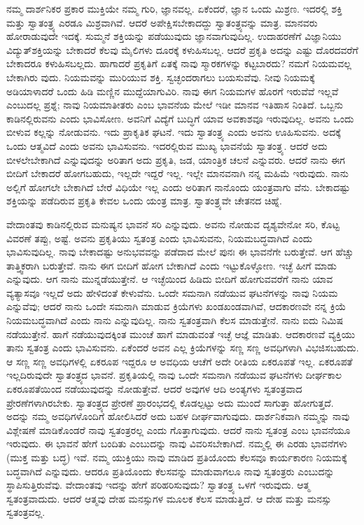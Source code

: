 ನಮ್ಮ ದಾರ್ಶನಿಕರ ಪ್ರಕಾರ ಮುಕ್ತಿಯೇ ನಮ್ಮ ಗುರಿ, ಜ್ಞಾನವಲ್ಲ. ಏಕೆಂದರೆ, ಜ್ಞಾನ ಒಂದು ಮಿಶ್ರಣ. ಇದರಲ್ಲಿ ಶಕ್ತಿ ಮತ್ತು ಸ್ವಾತಂತ್ರ್ಯ ಎರಡೂ ಮಿಶ್ರವಾಗಿವೆ. ಆದರೆ ಅಪೇಕ್ಷಿಸಬೇಕಾದದ್ದು ಸ್ವಾತಂತ್ರ್ಯವನ್ನು ಮಾತ್ರ. ಮಾನವರು ಹೋರಾಡುವುದೇ ಇದಕ್ಕೆ. ಸುಮ್ಮನೆ ಶಕ್ತಿಯನ್ನು ಪಡೆಯುವುದು ಜ್ಞಾನವಾಗುವುದಿಲ್ಲ. ಉದಾಹರಣೆಗೆ ವಿಜ್ಞಾನಿಯು ವಿದ್ಯುತ್​ಶಕ್ತಿಯನ್ನು ಬೇಕಾದರೆ ಕೆಲವು ಮೈಲಿಗಳು ದೂರಕ್ಕೆ ಕಳುಹಿಸಬಲ್ಲ. ಆದರೆ ಪ್ರಕೃತಿ ಅದನ್ನು ಎಷ್ಟು ದೊರದವರೆಗೆ ಬೇಕಾದರೂ ಕಳುಹಿಸಬಲ್ಲದು. ಹಾಗಾದರೆ ಪ್ರಕೃತಿಗೆ ಏತಕ್ಕೆ ನಾವು ಸ್ಮಾರಕಗಳನ್ನು ಕಟ್ಟಬಾರದು? ನಮಗೆ ನಿಯಮವಲ್ಲ ಬೇಕಾಗಿರು ವುದು. ನಿಯಮವನ್ನು ಮುರಿಯುವ ಶಕ್ತಿ. ಸ್ವಚ್ಛಂದರಾಗಲು ಬಯಸುವೆವು. ನೀವು ನಿಯಮಕ್ಕೆ ಅಡಿಯಾಳಾದರೆ ಒಂದು ಹಿಡಿ ಮಣ್ಣಿನ ಮುದ್ದೆಯಾಗುವಿರಿ. ನಾವು ಈಗ ನಿಯಮಗಳ ಹೊರಗೆ ಇರುವೆವೆ ಇಲ್ಲವೆ ಎಂಬುದಲ್ಲ ಪ್ರಶ್ನೆ; ನಾವು ನಿಯಮಾತೀತರು ಎಂಬ ಭಾವನೆಯ ಮೇಲೆ ಇಡೀ ಮಾನವ ಇತಿಹಾಸ ನಿಂತಿದೆ. ಒಬ್ಬನು ಕಾಡಿನಲ್ಲಿರುವನು ಎಂದು ಭಾವಿಸೋಣ. ಅವನಿಗೆ ವಿದ್ಯೆಗೆ ಬುದ್ಧಿಗೆ ಯಾವ ಅವಕಾಶವೂ ಇರುವುದಿಲ್ಲ. ಅವನು ಒಂದು ಬೀಳುವ ಕಲ್ಲನ್ನು ನೋಡುವನು. ಇದು ಪ್ರಾಕೃತಿಕ ಘಟನೆ. ಇದು ಸ್ವಾತಂತ್ರ್ಯ ಎಂದು ಅವನು ಊಹಿಸುವನು. ಅದಕ್ಕೆ ಒಂದು ಆತ್ಮವಿದೆ ಎಂದು ಅವನು ಭಾವಿಸುವನು. ಇದರಲ್ಲಿರುವ ಮುಖ್ಯ ಭಾವನೆಯೆ ಸ್ವಾತಂತ್ರ್ಯ. ಆದರೆ ಅದು ಬೀಳಲೇಬೇಕಾಗಿದೆ ಎನ್ನುವುದನ್ನು ಅರಿತಾಗ ಅದು ಪ್ರಕೃತಿ, ಜಡ, ಯಾಂತ್ರಿಕ ಚಲನೆ ಎನ್ನುವರು. ಆದರೆ ನಾನು ಈಗ ಬೀದಿಗೆ ಬೇಕಾದರೆ ಹೋಗಬಹುದು, ಇಲ್ಲದೇ ಇದ್ದರೆ ಇಲ್ಲ. ಇಲ್ಲೇ ಮಾನವನಾಗಿ ನನ್ನ ಮಹಿಮೆ ಇರುವುದು. ನಾನು ಅಲ್ಲಿಗೆ ಹೋಗಲೇ ಬೇಕಾಗಿದೆ ಬೇರೆ ವಿಧಿಯೇ ಇಲ್ಲ ಎಂದು ಅರಿತಾಗ ನಾನೊಂದು ಯಂತ್ರವಾಗು ವೆನು. ಬೇಕಾದಷ್ಟು ಶಕ್ತಿಯನ್ನು ಪಡೆದಿರುವ ಪ್ರಕೃತಿ ಕೇವಲ ಒಂದು ಯಂತ್ರ ಮಾತ್ರ. ಸ್ವಾತಂತ್ರ್ಯವೇ ಚೇತನದ ಚಿಹ್ನೆ.

ವೇದಾಂತವು ಕಾಡಿನಲ್ಲಿರುವ ಮನುಷ್ಯನ ಭಾವನೆ ಸರಿ ಎನ್ನುವುದು. ಅವನು ನೋಡುವ ದೃಶ್ಯವೇನೋ ಸರಿ, ಕೊಟ್ಟ ವಿವರಣೆ ತಪ್ಪು, ಅಷ್ಟೆ. ಅವನು ಪ್ರಕೃತಿಯು ಸ್ವತಂತ್ರ ಎಂದು ಭಾವಿಸುವನು, ನಿಯಮಬದ್ಧವಾಗಿದೆ ಎಂದು ಭಾವಿಸುವುದಿಲ್ಲ. ನಾವು ಬೇಕಾದಷ್ಟು ಅನುಭವವನ್ನು ಪಡೆದಾದ ಮೇಲೆ ಪುನಃ ಈ ಭಾವನೆಗೇ ಬರುತ್ತೇವೆ. ಆಗ ಹೆಚ್ಚು ತಾತ್ತ್ವಿಕರಾಗಿ ಬರುತ್ತೇವೆ. ನಾನು ಈಗ ಬೀದಿಗೆ ಹೋಗ ಬೇಕಾಗಿದೆ ಎಂದು ಇಟ್ಟುಕೊಳ್ಳೋಣ. ಇಚ್ಛೆ ಹೀಗೆ ಮಾಡು ಎನ್ನುವುದು. ಆಗ ನಾನು ಮುನ್ನಡೆಯುತ್ತೇನೆ. ಆ ಇಚ್ಛೆಯಿಂದ ಹಿಡಿದು ಬೀದಿಗೆ ಹೋಗುವವರೆಗೆ ನಾನು ಯಾವ ವ್ಯತ್ಯಾಸವೂ ಇಲ್ಲದೆ ಅದು ಹೇಳಿದಂತೆ ಕೇಳುವೆನು. ಒಂದೇ ಸಮನಾಗಿ ನಡೆಯುವ ಘಟನೆಗಳನ್ನು ನಾವು ನಿಯಮ ಎನ್ನುವೆವು; ಆದರೆ ನಾನು ಒಂದೇ ಸಮನಾಗಿ ಮಾಡುವ ಕ್ರಿಯೆಗಳು ಖಂಡಖಂಡವಾಗಿವೆ, ಆದಕಾರಣವೇ ನನ್ನ ಕ್ರಿಯೆ ನಿಯಮಬದ್ಧವಾಗಿದೆ ಎಂದು ನಾನು ಎನ್ನುವುದಿಲ್ಲ. ನಾನು ಸ್ವತಂತ್ರವಾಗಿ ಕೆಲಸ ಮಾಡುತ್ತೇನೆ. ನಾನು ಐದು ನಿಮಿಷ ನಡೆಯುತ್ತೇನೆ. ಹಾಗೆ ನಡೆಯುವುದಕ್ಕಿಂತ ಮುಂಚೆ ಹಾಗೆ ಮಾಡುವಂತೆ ಇಚ್ಛೆ ಆಜ್ಞೆ ಮಾಡಿತು. ಆದಕಾರಣವೆ ವ್ಯಕ್ತಿಯು ತಾನು ಸ್ವತಂತ್ರ ಎಂದು ಭಾವಿಸುವನು. ಏಕೆಂದರೆ ಅವನ ಎಲ್ಲ ಕ್ರಿಯೆಗಳನ್ನು ಸಣ್ಣ ಸಣ್ಣ ಅವಧಿಗಳಾಗಿ ವಿಭಜಿಸಬಹುದು. ಆ ಸಣ್ಣ ಸಣ್ಣ ಅವಧಿಗಳಲ್ಲಿ ಏಕರೂಪ ಇದ್ದರೂ ಆ ಅವಧಿಯ ಆಚೆಗೆ ಅದೇ ರೀತಿಯ ಏಕರೂಪತೆ ಇಲ್ಲ. ಏಕರೂಪತೆ ಇಲ್ಲದಿರುವುದೇ ಸ್ವಾತಂತ್ರ್ಯದ ಭಾವನೆ. ಪ್ರಕೃತಿಯಲ್ಲಿ ನಾವು ಒಂದೇ ಸಮನಾಗಿ ನಡೆಯುವ ಘಟನೆಗಳು ದೀರ್ಘಕಾಲ ಏಕರೂಪತೆಯಿಂದ ನಡೆಯುವುದನ್ನು ನೋಡುತ್ತೇವೆ. ಆದರೆ ಅವುಗಳ ಆದಿ ಅಂತ್ಯಗಳು ಸ್ವತಂತ್ರವಾದ ಪ್ರೇರಣೆಗಳಾಗಿರಬೇಕು. ಸ್ವಾತಂತ್ರ್ಯದ ಪ್ರೇರಣೆ ಪ್ರಾರಂಭದಲ್ಲಿ ಕೊಡಲ್ಪಟ್ಟು ಅದು ಮುಂದೆ ಸಾಗುತ್ತಾ ಹೋಗುತ್ತದೆ. ಅದನ್ನು ನಮ್ಮ ಅವಧಿಗಳೊಂದಿಗೆ ಹೋಲಿಸಿದರೆ ಅದು ಬಹಳ ದೀರ್ಘವಾಗುವುದು. ದಾರ್ಶನಿಕವಾಗಿ ನಮ್ಮನ್ನು ನಾವು ವಿಶ್ಲೇಷಣೆ ಮಾಡಿಕೊಂಡರೆ ನಾವು ಸ್ವತಂತ್ರರಲ್ಲ ಎಂದು ಗೊತ್ತಾಗುವುದು. ಆದರೆ ನಾನು ಸ್ವತಂತ್ರ ಎಂಬ ಭಾವನೆಯೂ ಇರುವುದು. ಈ ಭಾವನೆ ಹೇಗೆ ಬಂದಿತು ಎಂಬುದನ್ನು ನಾವು ವಿವರಿಸಬೇಕಾಗಿದೆ. ನಮ್ಮಲ್ಲಿ ಈ ಎರಡು ಭಾವನೆಗಳು (ಮುಕ್ತ ಮತ್ತು ಬದ್ಧ) ಇವೆ. ನಮ್ಮ ಯುಕ್ತಿಯು ನಾವು ಮಾಡಿದ ಪ್ರತಿಯೊಂದು ಕೆಲಸವೂ ಕಾರ್ಯಕಾರಣ ನಿಯಮಕ್ಕೆ ಬದ್ಧವಾಗಿದೆ ಎನ್ನುವುದು. ಆದರೂ ಪ್ರತಿಯೊಂದು ಕೆಲಸವನ್ನು ಮಾಡುವಾಗಲೂ ನಾವು ಸ್ವತಂತ್ರರು ಎಂಬುದನ್ನು ಸ್ಥಾಪಿಸುತ್ತಿರುವೆವು. ವೇದಾಂತವು ಇದನ್ನು ಹೇಗೆ ಪರಿಹರಿಸುವುದು? ಸ್ವಾತಂತ್ರ್ಯ ಒಳಗೆ ಇರುವುದು. ಆತ್ಮ ಸ್ವತಂತ್ರವಾದುದು. ಆದರೆ ಆತ್ಮವು ದೇಹ ಮನಸ್ಸುಗಳ ಮೂಲಕ ಕೆಲಸ ಮಾಡುತ್ತಿದೆ. ಆ ದೇಹ ಮತ್ತು ಮನಸ್ಸು ಸ್ವತಂತ್ರವಲ್ಲ.

